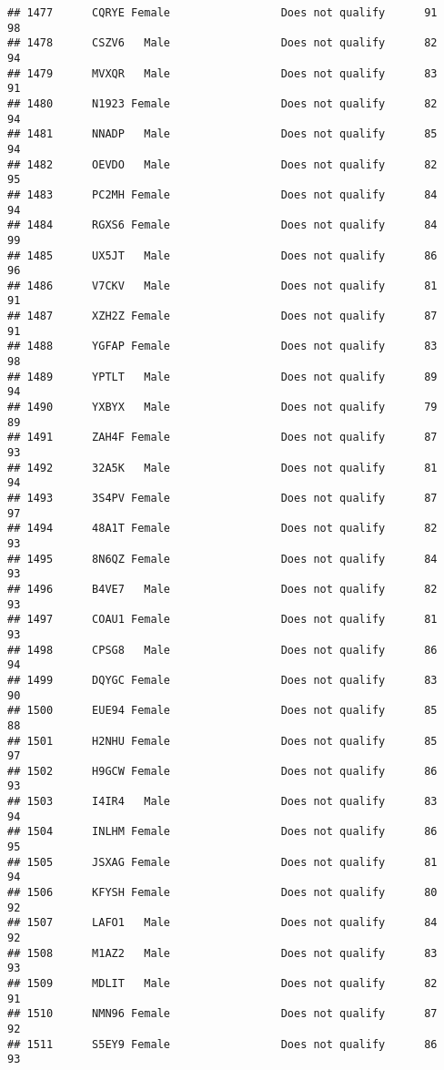\documentclass[
]{article}
\begin{document}
\begin{verbatim}
## 1477      CQRYE Female                 Does not qualify      91       98
## 1478      CSZV6   Male                 Does not qualify      82       94
## 1479      MVXQR   Male                 Does not qualify      83       91
## 1480      N1923 Female                 Does not qualify      82       94
## 1481      NNADP   Male                 Does not qualify      85       94
## 1482      OEVDO   Male                 Does not qualify      82       95
## 1483      PC2MH Female                 Does not qualify      84       94
## 1484      RGXS6 Female                 Does not qualify      84       99
## 1485      UX5JT   Male                 Does not qualify      86       96
## 1486      V7CKV   Male                 Does not qualify      81       91
## 1487      XZH2Z Female                 Does not qualify      87       91
## 1488      YGFAP Female                 Does not qualify      83       98
## 1489      YPTLT   Male                 Does not qualify      89       94
## 1490      YXBYX   Male                 Does not qualify      79       89
## 1491      ZAH4F Female                 Does not qualify      87       93
## 1492      32A5K   Male                 Does not qualify      81       94
## 1493      3S4PV Female                 Does not qualify      87       97
## 1494      48A1T Female                 Does not qualify      82       93
## 1495      8N6QZ Female                 Does not qualify      84       93
## 1496      B4VE7   Male                 Does not qualify      82       93
## 1497      COAU1 Female                 Does not qualify      81       93
## 1498      CPSG8   Male                 Does not qualify      86       94
## 1499      DQYGC Female                 Does not qualify      83       90
## 1500      EUE94 Female                 Does not qualify      85       88
## 1501      H2NHU Female                 Does not qualify      85       97
## 1502      H9GCW Female                 Does not qualify      86       93
## 1503      I4IR4   Male                 Does not qualify      83       94
## 1504      INLHM Female                 Does not qualify      86       95
## 1505      JSXAG Female                 Does not qualify      81       94
## 1506      KFYSH Female                 Does not qualify      80       92
## 1507      LAFO1   Male                 Does not qualify      84       92
## 1508      M1AZ2   Male                 Does not qualify      83       93
## 1509      MDLIT   Male                 Does not qualify      82       91
## 1510      NMN96 Female                 Does not qualify      87       92
## 1511      S5EY9 Female                 Does not qualify      86       93

\end{verbatim}
\end{document}
